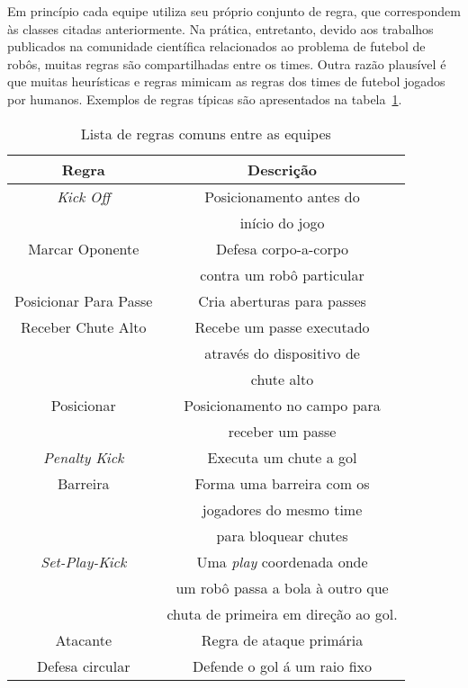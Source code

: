 Em princípio cada equipe utiliza seu próprio conjunto de regra, que correspondem
às classes citadas anteriormente.
Na prática, entretanto, devido aos trabalhos publicados na comunidade científica
relacionados ao problema de futebol de robôs, muitas regras são compartilhadas
entre os times. Outra razão plausível é que muitas heurísticas e regras mimicam
as regras dos times de futebol jogados por humanos. Exemplos de regras típicas são
apresentados na tabela~\ref{regras}.

\begin{table}
  \begin{center}
    \begin{tabular}{|c|c|}
      \hline
      Regra                  & Descrição \\
      \hline
      \textit{Kick Off}      & Posicionamento antes do\\
                             & início do jogo\\
      \hline
      Marcar Oponente        & Defesa corpo-a-corpo\\
                             & contra um robô particular\\
      \hline
      Posicionar Para Passe  & Cria aberturas para passes\\
      \hline
      Receber Chute Alto     & Recebe um passe executado\\
                             & através do dispositivo de\\
      & chute alto\\
      \hline
      Posicionar             & Posicionamento no campo para\\
                             & receber um passe\\
      \hline
      \textit{Penalty Kick}  & Executa um chute a gol\\
      \hline
      Barreira               & Forma uma barreira com os \\
                             & jogadores do mesmo time \\
                             & para bloquear chutes\\
      \hline
      \textit{Set-Play-Kick} & Uma \textit{play} coordenada onde\\
                             & um robô passa a bola à outro que \\
                             & chuta de primeira em direção ao gol.\\
      \hline
      Atacante               & Regra de ataque primária\\
      \hline
      Defesa circular        & Defende o gol á um raio fixo\\
      \hline
    \end{tabular}
    \caption{Lista de regras comuns entre as equipes \cite{vail2008crf}}
  \label{regras}
  \end{center}
\end{table}

